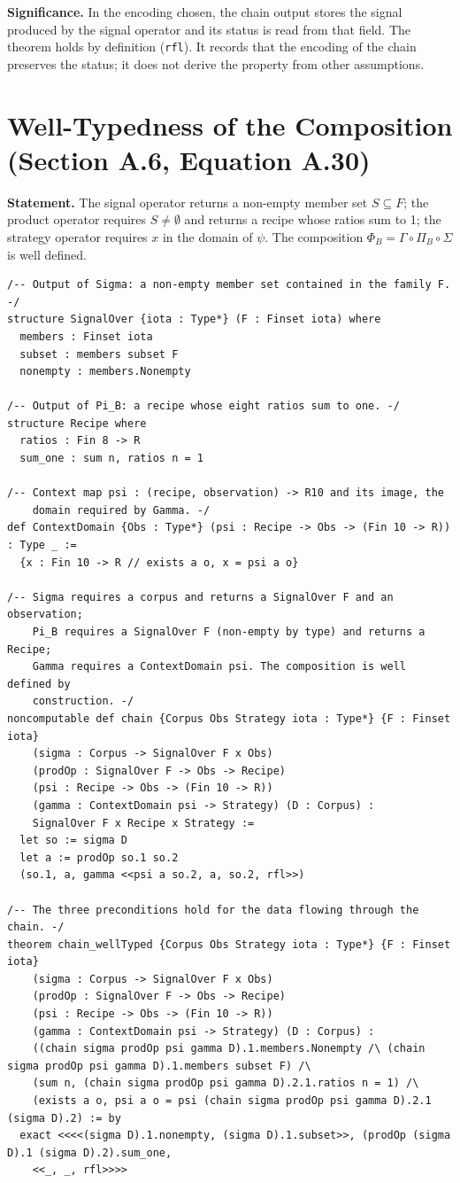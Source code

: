 \documentclass[11pt,a4paper]{article}
\begin{document}
	\noindent\textbf{Significance.} In the encoding chosen, the chain output stores the signal produced by the signal operator and its status is read from that field. The theorem holds by definition (\texttt{rfl}). It records that the encoding of the chain preserves the status; it does not derive the property from other assumptions.

	\section{Well-Typedness of the Composition (Section A.6, Equation A.30)}

	\textbf{Statement.} The signal operator returns a non-empty member set $S\subseteq F$; the product operator requires $S\neq\emptyset$ and returns a recipe whose ratios sum to 1; the strategy operator requires $x$ in the domain of $\psi$. The composition $\Phi_B=\Gamma\circ\Pi_B\circ\Sigma$ is well defined.

\begin{lstlisting}
/-- Output of Sigma: a non-empty member set contained in the family F. -/
structure SignalOver {iota : Type*} (F : Finset iota) where
  members : Finset iota
  subset : members subset F
  nonempty : members.Nonempty

/-- Output of Pi_B: a recipe whose eight ratios sum to one. -/
structure Recipe where
  ratios : Fin 8 -> R
  sum_one : sum n, ratios n = 1

/-- Context map psi : (recipe, observation) -> R10 and its image, the
    domain required by Gamma. -/
def ContextDomain {Obs : Type*} (psi : Recipe -> Obs -> (Fin 10 -> R)) : Type _ :=
  {x : Fin 10 -> R // exists a o, x = psi a o}

/-- Sigma requires a corpus and returns a SignalOver F and an observation;
    Pi_B requires a SignalOver F (non-empty by type) and returns a Recipe;
    Gamma requires a ContextDomain psi. The composition is well defined by
    construction. -/
noncomputable def chain {Corpus Obs Strategy iota : Type*} {F : Finset iota}
    (sigma : Corpus -> SignalOver F x Obs)
    (prodOp : SignalOver F -> Obs -> Recipe)
    (psi : Recipe -> Obs -> (Fin 10 -> R))
    (gamma : ContextDomain psi -> Strategy) (D : Corpus) :
    SignalOver F x Recipe x Strategy :=
  let so := sigma D
  let a := prodOp so.1 so.2
  (so.1, a, gamma <<psi a so.2, a, so.2, rfl>>)

/-- The three preconditions hold for the data flowing through the chain. -/
theorem chain_wellTyped {Corpus Obs Strategy iota : Type*} {F : Finset iota}
    (sigma : Corpus -> SignalOver F x Obs)
    (prodOp : SignalOver F -> Obs -> Recipe)
    (psi : Recipe -> Obs -> (Fin 10 -> R))
    (gamma : ContextDomain psi -> Strategy) (D : Corpus) :
    ((chain sigma prodOp psi gamma D).1.members.Nonempty /\ (chain sigma prodOp psi gamma D).1.members subset F) /\
    (sum n, (chain sigma prodOp psi gamma D).2.1.ratios n = 1) /\
    (exists a o, psi a o = psi (chain sigma prodOp psi gamma D).2.1 (sigma D).2) := by
  exact <<<<(sigma D).1.nonempty, (sigma D).1.subset>>, (prodOp (sigma D).1 (sigma D).2).sum_one,
    <<_, _, rfl>>>>
\end{lstlisting}
\end{document}
